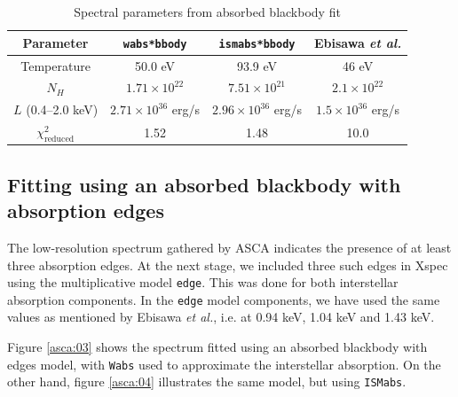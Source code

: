 				\begin{table}[h!]
					\begin{center}
						\caption{Spectral parameters from absorbed blackbody fit}
						\label{tab-asca:01}
						\begin{tabulary}{\textwidth}{CCC|C}
							\hline
							{Parameter} & {\texttt{wabs*bbody}} & {\texttt{ismabs*bbody}} & {Ebisawa \emph{et al.}} \\
							\hline
							{Temperature} & {50.0 eV} & {93.9 eV} & {46 eV} \\
							{$N_H$} & {$1.71\times 10^{22}$} & {$7.51\times 10^{21}$} & {$2.1\times 10^{22}$} \\
							{$L$ (0.4--2.0 keV)} & {$2.71\times 10^{36}$ erg/s} & {$2.96\times 10^{36}$ erg/s} & {$1.5\times 10^{36}$ erg/s} \\
							{$\chi_{\mathrm{reduced}}^2$} & {1.52} & {1.48} & {10.0} \\
							\hline
						\end{tabulary}	
					\end{center}
				\end{table}

			\subsection{Fitting using an absorbed blackbody with absorption edges} \label{continuum:asca:abs-bb-edge}
				The low-resolution spectrum gathered by ASCA indicates the presence of at least three absorption edges. At the next stage, we included three such edges in Xspec using the multiplicative model \texttt{edge}. This was done for both interstellar absorption components. In the \texttt{edge} model components, we have used the same values as mentioned by Ebisawa \emph{et al.}, i.e. at 0.94 keV, 1.04 keV and 1.43 keV.
				
				Figure \ref{asca:03} shows the spectrum fitted using an absorbed blackbody with edges model, with \texttt{Wabs} used to approximate the interstellar absorption. On the other hand, figure \ref{asca:04} illustrates the same model, but using \texttt{ISMabs}.
				
